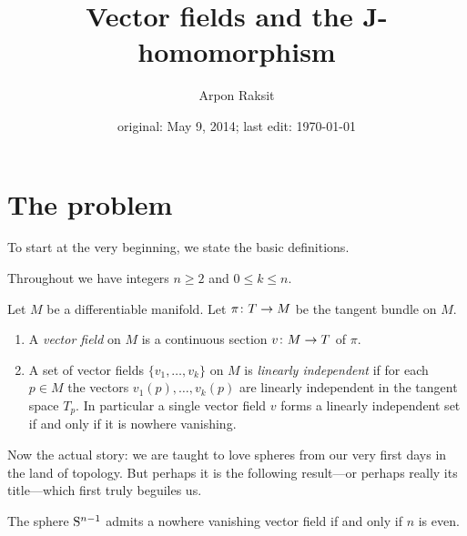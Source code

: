 


\usepackage{tikz}


\title{Vector fields and the J-homomorphism}
\author{Arpon Raksit}
\date{original: May 9, 2014; last edit: \today}


\maketitle
\thispagestyle{fancy}


\section{The problem}

To start at the very beginning, we state the basic definitions.

\begin{notation}
  \label{ints}
  Throughout we have integers $n \ge 2$ and $0 \le k \le n$.
\end{notation}

\begin{definitions}
  \label{vfield-dfn}
  Let $M$ be a differentiable manifold. Let $\pi \c T \to M$ be the
  tangent bundle on $M$.
  \begin{enumerate}
  \item A \emph{vector field} on $M$ is a continuous section $v \c M
    \to T$ of $\pi$.
  \item A set of vector fields $\{v_1,\ldots,v_k\}$ on $M$ is
    \emph{linearly independent} if for each $p \in M$ the vectors
    $v_1(p),\ldots,v_k(p)$ are linearly independent in the tangent
    space $T_p$. In particular a single vector field $v$ forms a
    linearly independent set if and only if it is nowhere vanishing.
  \end{enumerate}
\end{definitions}

Now the actual story: we are taught to love spheres from our very
first days in the land of topology. But perhaps it is the following
result---or perhaps really its title---which first truly beguiles us.

\begin{theorem}
  \label{hairy-ball}
  The sphere $\S^{n-1}$ admits a nowhere vanishing vector field if and
  only if $n$ is even.
\end{theorem}

